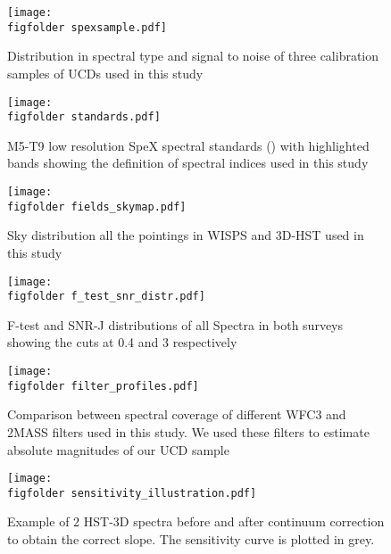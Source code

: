 \newcommand{\figfolder}{/users/caganze/research/wisps/figures/}
\newcommand{\spectrafolder}{/Users/caganze/research/wisps/figures/ltwarfs/}




\begin{figure}
   \centering
   \texttt{[image: \\figfolder spexsample.pdf]}
   \caption{Distribution in spectral type and signal to noise of three calibration samples of UCDs used in this study}
   \label{fig:spexsample}
\end{figure}


\begin{figure}
    \centering
    \texttt{[image: \\figfolder standards.pdf]}
    \caption{M5-T9 low resolution SpeX spectral standards (\citealt{2010ApJS..190..100K}) with highlighted bands showing the definition of spectral indices used in this study}
    \label{fig:indexdefinition}
\end{figure}



\begin{figure}
    \centering
    \texttt{[image: \\figfolder fields\_skymap.pdf]}
    \caption{Sky distribution all the pointings in WISPS and 3D-HST used in this study}
    \label{fig:skymap}
\end{figure}

\begin{figure}
    \centering
    \texttt{[image: \\figfolder f\_test\_snr\_distr.pdf]}
    \caption{F-test and SNR-J distributions of all Spectra in both surveys showing the cuts at 0.4 and 3 respectively}
    \label{fig:ftestdistr}
\end{figure}



\begin{figure}
    \centering
    \texttt{[image: \\figfolder filter\_profiles.pdf]}
    \caption{Comparison between spectral coverage of different WFC3 and 2MASS filters used in this study. We used these filters to estimate absolute magnitudes of our UCD sample}
    \label{fig:filterprofiles}
\end{figure}



\begin{figure}
\centering
\texttt{[image: \\figfolder sensitivity\_illustration.pdf]}
\caption{ Example of 2 HST-3D spectra before and after continuum correction to obtain the correct slope. The sensitivity curve is plotted in grey.}
\label{fig:sensitivity}
\end{figure}

